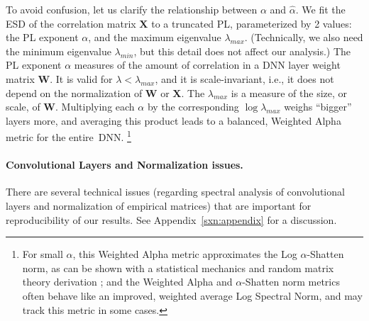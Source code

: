 To avoid confusion, let us clarify the relationship between $\alpha$ and $\hat{\alpha}$.  
We fit the ESD of the correlation matrix $\mathbf{X}$ to a truncated PL, parameterized by 2 values: the PL exponent $\alpha$, and the maximum eigenvalue $\lambda_{max}$.  
(Technically, we also need the minimum eigenvalue $\lambda_{min}$, but this detail does not affect our analysis.)
The PL exponent $\alpha$ measures of the amount of correlation in a DNN layer weight matrix $\mathbf{W}$. 
It is valid for $\lambda<\lambda_{max}$, and it is scale-invariant, i.e., it does not depend on the normalization of $\mathbf{W}$ or $\mathbf{X}$.
The $\lambda_{max}$ is a measure of the size, or scale, of $\mathbf{W}$.
%
Multiplying each $\alpha$ by the corresponding $\log\lambda_{max}$ weighs ``bigger'' layers more, and averaging this product leads to a balanced, Weighted Alpha metric for the entire~DNN.%
\footnote{For small $\alpha$, this Weighted Alpha metric approximates the Log $\alpha$-Shatten norm, as can be shown with a statistical mechanics and random matrix theory derivation \cite{MM20_unpub_work}; and the Weighted Alpha and $\alpha$-Shatten norm metrics often behave like an improved, weighted average Log Spectral Norm, and may track this metric in some cases.}


\paragraph{Convolutional Layers and Normalization issues.}
There are several technical issues (regarding spectral analysis of convolutional layers and normalization of empirical matrices) that are important for reproducibility of our results.
See Appendix~\ref{sxn:appendix} for a discussion.


